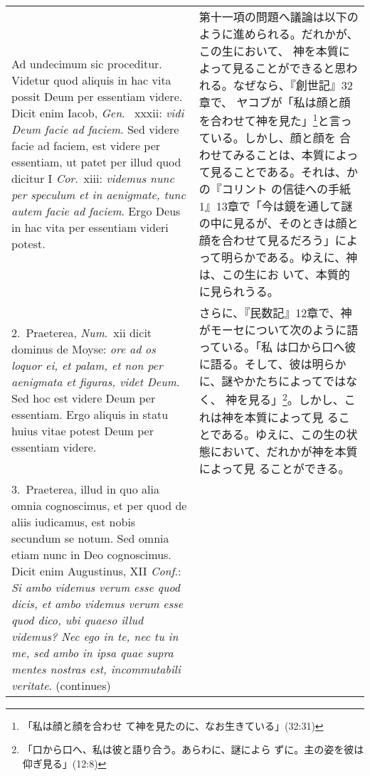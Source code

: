 \documentclass[10pt]{jsarticle} %
\begin{document}
\begin{longtable}{p{21em}p{21em}}


{\sc Ad undecimum sic proceditur}. Videtur quod aliquis in hac vita
possit Deum per essentiam videre. Dicit enim Iacob, {\it Gen}.~{\sc
xxxii}: {\it vidi Deum facie ad faciem}. Sed videre facie ad faciem,
est videre per essentiam, ut patet per illud quod dicitur I {\it
Cor}.~{\sc xiii}: {\it videmus nunc per speculum et in aenigmate, tunc
autem facie ad faciem}. Ergo Deus in hac vita per essentiam videri
potest.


&

第十一項の問題へ議論は以下のように進められる。だれかが、この生において、
神を本質によって見ることができると思われる。なぜなら、『創世記』32章で、
ヤコブが「私は顔と顔を合わせて神を見た」\footnote{「私は顔と顔を合わせ
て神を見たのに、なお生きている」(32:31)}と言っている。しかし、顔と顔を
合わせてみることは、本質によって見ることである。それは、かの『コリント
の信徒への手紙1』13章で「今は鏡を通して謎の中に見るが、そのときは顔と
顔を合わせて見るだろう」によって明らかである。ゆえに、神は、この生にお
いて、本質的に見られうる。

\\




2.~{\sc Praeterea}, {\it Num}.~{\sc xii} dicit dominus de Moyse: {\it
 ore ad os loquor ei, et palam, et non per aenigmata et figuras, videt
 Deum}. Sed hoc est videre Deum per essentiam. Ergo aliquis in statu
 huius vitae potest Deum per essentiam videre.


&

さらに、『民数記』12章で、神がモーセについて次のように語っている。「私
は口から口へ彼に語る。そして、彼は明らかに、謎やかたちによってではなく、
神を見る」\footnote{「口から口へ、私は彼と語り合う。あらわに、謎によら
ずに。主の姿を彼は仰ぎ見る」(12:8)}。しかし、これは神を本質によって見
ることである。ゆえに、この生の状態において、だれかが神を本質によって見
ることができる。

\\




3.~{\sc Praeterea}, illud in quo alia omnia cognoscimus, et per quod
de aliis iudicamus, est nobis secundum se notum. Sed omnia etiam nunc
in Deo cognoscimus. Dicit enim Augustinus, XII {\it Conf}.: {\it Si
ambo videmus verum esse quod dicis, et ambo videmus verum esse quod
dico, ubi quaeso illud videmus? Nec ego in te, nec tu in me, sed ambo
in ipsa quae supra mentes nostras est, incommutabili
veritate}. (continues)


\end{longtable}
\end{document}

